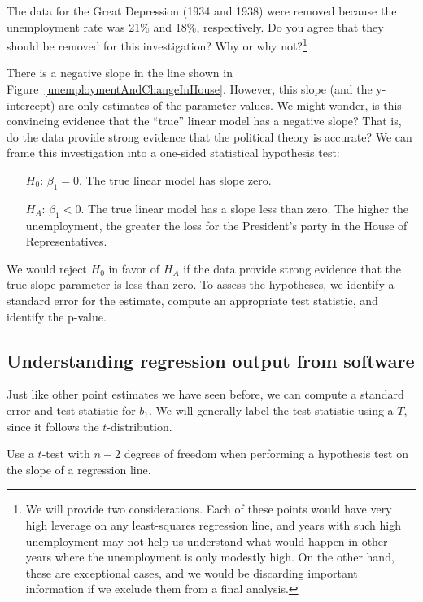 \begin{exercise}
The data for the Great Depression (1934 and 1938) were removed because the unemployment rate was 21\% and 18\%, respectively. Do you agree that they should be removed for this investigation? Why or why not?\footnote{We will provide two considerations. Each of these points would have very high leverage on any least-squares regression line, and years with such high unemployment may not help us understand what would happen in other years where the unemployment is only modestly high. On the other hand, these are exceptional cases, and we would be discarding important information if we exclude them from a final analysis.}
\end{exercise}

There is a negative slope in the line shown in Figure~\ref{unemploymentAndChangeInHouse}. However, this slope (and the y-intercept) are only estimates of the parameter values. We might wonder, is this convincing evidence that the ``true'' linear model has a negative slope? That is, do the data provide strong evidence that the political theory is accurate? We can frame this investigation into a one-sided statistical hypothesis test:
\begin{itemize}
\item[$H_0$:] $\beta_1 = 0$. The true linear model has slope zero.
\item[$H_A$:] $\beta_1 < 0$. The true linear model has a slope less than zero. The higher the unemployment, the greater the loss for the President's party in the House of Representatives.
\end{itemize}
We would reject $H_0$ in favor of $H_A$ if the data provide strong evidence that the true slope parameter is less than zero. To assess the hypotheses, we identify a standard error for the estimate, compute an appropriate test statistic, and identify the p-value.


\subsection{Understanding regression output from software}
\label{testStatisticForTheSlope}

Just like other point estimates we have seen before, we can compute a standard error and test statistic for $b_1$. We will generally label the test statistic using a $T$, since it follows the $t$-distribution.

\begin{tipBox}{
Use a $t$-test with $n - 2$ degrees of freedom when performing a hypothesis test on the slope of a regression line.}
\end{tipBox}


